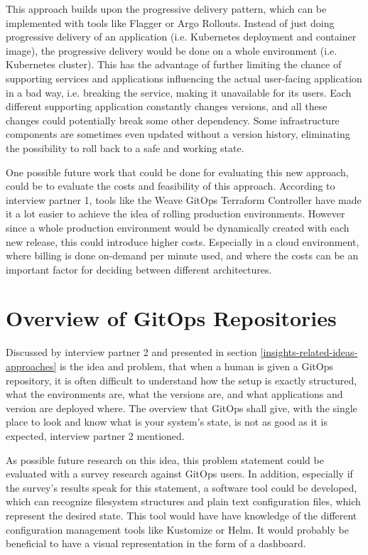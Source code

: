 This approach builds upon the progressive delivery pattern,
which can be implemented with tools like Flagger or Argo Rollouts.
Instead of just doing progressive delivery of an application (i.e. Kubernetes deployment and container image),
the progressive delivery would be done on a whole environment (i.e. Kubernetes cluster).
This has the advantage of further limiting the chance of supporting services and applications
influencing the actual user-facing application in a bad way, i.e. breaking the service, making it unavailable for its users.
Each different supporting application constantly changes versions, and all these changes could potentially break some other dependency.
Some infrastructure components are sometimes even updated without a version history,
eliminating the possibility to roll back to a safe and working state.

One possible future work that could be done for evaluating this new approach,
could be to evaluate the costs and feasibility of this approach.
According to interview partner 1, tools like the Weave GitOps Terraform Controller
have made it a lot easier to achieve the idea of rolling production environments.
However since a whole production environment would be dynamically created with each new release,
this could introduce higher costs.
Especially in a cloud environment, where billing is done on-demand per minute used,
and where the costs can be an important factor for deciding between different architectures.

\section*{Overview of GitOps Repositories}

Discussed by interview partner 2 and presented in section \ref{insights-related-ideas-approaches}
is the idea and problem, that when a human is given a GitOps repository,
it is often difficult to understand how the setup is exactly structured,
what the environments are,
what the versions are,
and what applications and version are deployed where.
The overview that GitOps shall give,
with the single place to look and know what is your system's state,
is not as good as it is expected,
interview partner 2 mentioned.

As possible future research on this idea,
this problem statement could be evaluated with a survey research against GitOps users.
In addition, especially if the survey's results speak for this statement,
a software tool could be developed,
which can recognize filesystem structures and plain text configuration files,
which represent the desired state.
This tool would have have knowledge of the different configuration management tools like Kustomize or Helm.
It would probably be beneficial to have a visual representation in the form of a dashboard.

